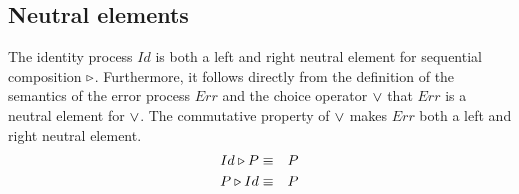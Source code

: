 \subsection{Neutral elements}
The identity process $Id$ is both a left and right neutral element for sequential composition $\triangleright$. Furthermore, it follows directly from the definition of the semantics of the error process $Err$ and the choice operator $\vee$ that $Err$ is a neutral element for $\vee$. The commutative property of $\vee$ makes $Err$ both a left and right neutral element.
\begin{eqnarray*}
  Id \triangleright P & \equiv & P \\
  P \triangleright Id & \equiv & P
\end{eqnarray*}